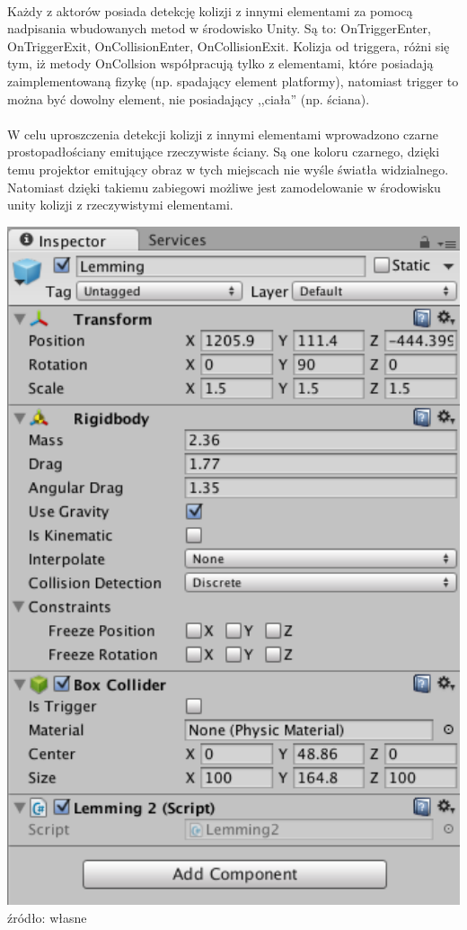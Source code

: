 \paragraph{}
Każdy z aktorów posiada detekcję kolizji z innymi elementami za pomocą nadpisania wbudowanych metod w środowisko Unity. Są to: OnTriggerEnter, OnTriggerExit, OnCollisionEnter, OnCollisionExit. Kolizja od triggera, różni się tym, iż metody OnCollsion współpracują tylko z elementami, które posiadają zaimplementowaną fizykę (np. spadający element platformy), natomiast trigger to można być dowolny element, nie posiadający ,,ciała'' (np. ściana).

\paragraph{}
W celu uproszczenia detekcji kolizji z innymi elementami wprowadzono czarne prostopadłościany emitujące rzeczywiste ściany. Są one koloru czarnego, dzięki temu projektor emitujący obraz w tych miejscach nie wyśle światła widzialnego. Natomiast dzięki takiemu zabiegowi możliwe jest zamodelowanie w środowisku unity kolizji z rzeczywistymi elementami.

\begin{center}
\includegraphics[width=1\textwidth]{images/aktor.png}
\small {źródło: własne }
\end{center}

